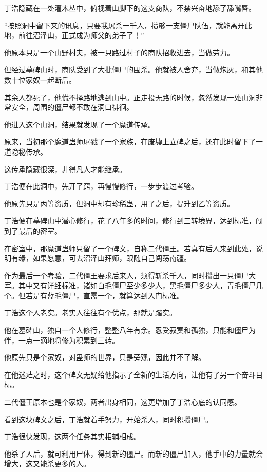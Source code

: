 
\begin{this_body}

丁浩隐藏在一处灌木丛中，俯视着山脚下的这支商队，不禁兴奋地舔了舔嘴唇。

“按照洞中留下来的讯息，只要我屠杀一千人，攒够一支僵尸队伍，就能离开此地，前往沼泽山，正式成为师父的弟子了！”

他原本只是一个山野村夫，被一只路过村子的商队招收进去，当做劳力。

但经过墓碑山时，商队受到了大批僵尸的围杀。他就被人舍弃，当做炮灰，和其他数十位家奴一起断后。

其余人都死了，他慌不择路地逃到山中。正走投无路的时候，忽然发现一处山洞非常安全，周围的僵尸都不敢在洞口徘徊。

他进入这个山洞，结果就发现了一个魔道传承。

原来，当初那个魔道蛊师屠戮了一个家族，在废墟上立碑之后，还在此时留下了一道隐秘传承。

这传承隐藏很深，非得凡人才能继承。

丁浩便在此洞中，先开了窍，再慢慢修行，一步步渡过考验。

他原先只是丙等资质，但洞中却有珍稀蛊，用了之后，提升到乙等资质。

丁浩便在墓碑山中潜心修行，花了八年多的时间，修行到三转境界，达到标准，闯到了最后的密室。

在密室中，那魔道蛊师只留了一个碑文，自称二代僵王。若真有后人来到此处，说明有缘，如果愿意，可去沼泽山拜师，跟随自己闯荡南疆。

作为最后一个考验，二代僵王要求后来人，须得斩杀千人，同时攒出一只僵尸大军。其中又有详细标准，诸如白毛僵尸至少多少人，黑毛僵尸多少人，青毛僵尸几个。但若是有蓝毛僵尸，直需一个，就算达到入门标准。

丁浩这个人老实。老实人往往有个优点，那就是踏实。

他在墓碑山，独自一个人修行，整整八年有余。忍受寂寞和孤独，只能和僵尸为伴，一点一滴地将修为积累到三转。

他原先只是个家奴，对蛊师的世界，只是旁观，因此并不了解。

在他迷茫之时，这个碑文无疑给他指示了全新的生活方向，让他有了另一个奋斗目标。

二代僵王原本也是个家奴，两者出身相同，这更增加了丁浩心底的认同感。

看到这块碑文之后，丁浩就着手努力，开始杀人，同时积攒僵尸。

丁浩很快发现，这两个任务其实相辅相成。

他杀了人后，就可利用尸体，得到新的僵尸。而新的僵尸加入，他手中的力量就会增大，这又能杀更多的人。


\end{this_body}
